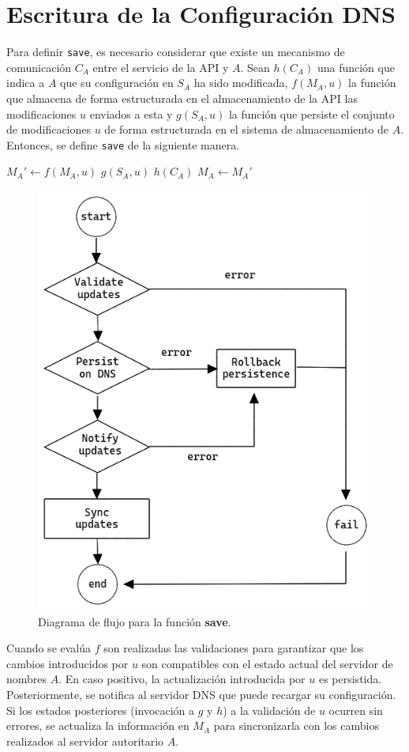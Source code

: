 \section{Escritura de la Configuración DNS}

Para definir \verb+save+, es necesario considerar que existe un mecanismo de comunicación $C_A$ entre el servicio de la API y $A$. Sean $h(C_A)$ una función que indica a $A$ que su configuración en $S_A$ ha sido modificada, $f(M_A, u)$ la función que almacena de forma estructurada en el almacenamiento de la API las modificaciones $u$ enviados a esta y $g(S_A, u)$ la función que persiste el conjunto de modificaciones $u$ de forma estructurada en el sistema de almacenamiento de $A$. Entonces, se define \verb+save+ de la siguiente manera.

\begin{algorithmic}\label{proc:save}
    \State $M_A' \leftarrow f(M_A, u)$
    \State $g(S_A, u)$
    \State $h(C_A)$
    \State $M_A \leftarrow M_A'$
\EndProcedure
\end{algorithmic}

\begin{figure}[!ht]
    \centering
    \includegraphics[width=0.6\linewidth]{draws/save.png}
    \caption{Diagrama de flujo para la función \textbf{save}.}
\end{figure}

Cuando se evalúa $f$ son realizadas las validaciones para garantizar que los cambios introducidos por $u$ son compatibles con el estado actual del servidor de nombres $A$. En caso positivo, la actualización introducida por $u$ es persistida. Posteriormente, se notifica al servidor DNS que puede recargar su configuración. Si los estados posteriores (invocación a $g$ y $h$) a la validación de $u$ ocurren sin errores, se actualiza la información en $M_A$ para sincronizarla con los cambios realizados al servidor autoritario $A$.


